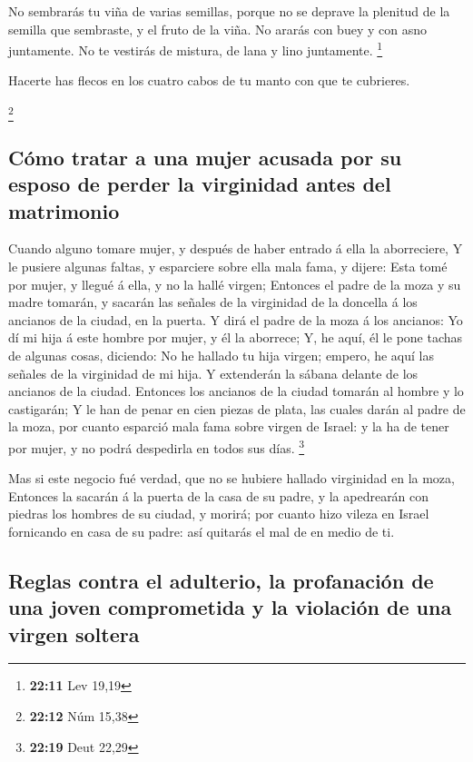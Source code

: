  No sembrarás tu viña de varias semillas, porque no se
deprave la plenitud de la semilla que sembraste, y el fruto de la viña.
 No ararás con buey y con asno juntamente.  No
te vestirás de mistura, de lana y lino juntamente. \footnote{\textbf{22:11}
  Lev 19,19}

 Hacerte has flecos en los cuatro cabos de tu manto con que
te cubrieres.

\footnote{\textbf{22:12} Núm 15,38}

\hypertarget{cuxf3mo-tratar-a-una-mujer-acusada-por-su-esposo-de-perder-la-virginidad-antes-del-matrimonio}{%
\subsection{Cómo tratar a una mujer acusada por su esposo de perder la
virginidad antes del
matrimonio}\label{cuxf3mo-tratar-a-una-mujer-acusada-por-su-esposo-de-perder-la-virginidad-antes-del-matrimonio}}

 Cuando alguno tomare mujer, y después de haber entrado á
ella la aborreciere,  Y le pusiere algunas faltas, y
esparciere sobre ella mala fama, y dijere: Esta tomé por mujer, y llegué
á ella, y no la hallé virgen;  Entonces el padre de la moza
y su madre tomarán, y sacarán las señales de la virginidad de la
doncella á los ancianos de la ciudad, en la puerta.  Y dirá
el padre de la moza á los ancianos: Yo dí mi hija á este hombre por
mujer, y él la aborrece;  Y, he aquí, él le pone tachas de
algunas cosas, diciendo: No he hallado tu hija virgen; empero, he aquí
las señales de la virginidad de mi hija. Y extenderán la sábana delante
de los ancianos de la ciudad.  Entonces los ancianos de la
ciudad tomarán al hombre y lo castigarán;  Y le han de
penar en cien piezas de plata, las cuales darán al padre de la moza, por
cuanto esparció mala fama sobre virgen de Israel: y la ha de tener por
mujer, y no podrá despedirla en todos sus días. \footnote{\textbf{22:19}
  Deut 22,29}

 Mas si este negocio fué verdad, que no se hubiere hallado
virginidad en la moza,  Entonces la sacarán á la puerta de
la casa de su padre, y la apedrearán con piedras los hombres de su
ciudad, y morirá; por cuanto hizo vileza en Israel fornicando en casa de
su padre: así quitarás el mal de en medio de ti.

\hypertarget{reglas-contra-el-adulterio-la-profanaciuxf3n-de-una-joven-comprometida-y-la-violaciuxf3n-de-una-virgen-soltera}{%
\subsection{Reglas contra el adulterio, la profanación de una joven
comprometida y la violación de una virgen
soltera}\label{reglas-contra-el-adulterio-la-profanaciuxf3n-de-una-joven-comprometida-y-la-violaciuxf3n-de-una-virgen-soltera}}

